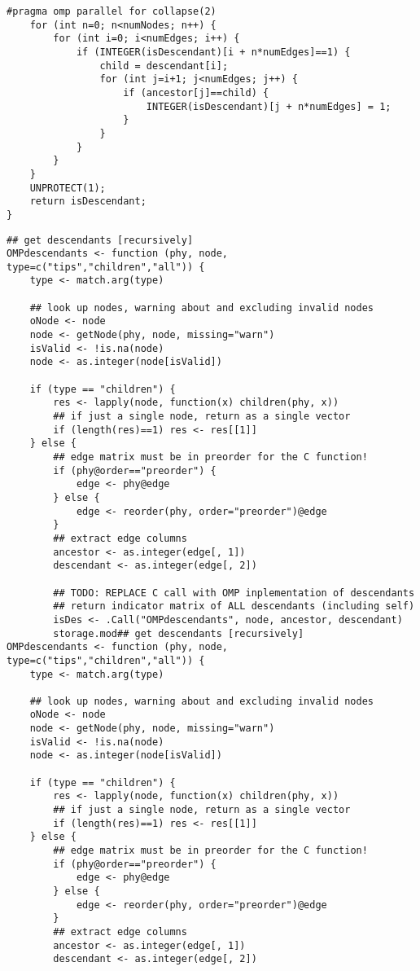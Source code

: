 \documentclass[11pt,letterpaper]{article}
\begin{document}
\begin{lstlisting}[style=MyC++Style]
#pragma omp parallel for collapse(2)
    for (int n=0; n<numNodes; n++) {
        for (int i=0; i<numEdges; i++) {
            if (INTEGER(isDescendant)[i + n*numEdges]==1) {
                child = descendant[i];
                for (int j=i+1; j<numEdges; j++) {
                    if (ancestor[j]==child) {
                        INTEGER(isDescendant)[j + n*numEdges] = 1; 
                    }
                }
            }
        }
    }
    UNPROTECT(1);
    return isDescendant;
}
\end{lstlisting}

\begin{lstlisting}[style=MyR]
## get descendants [recursively]
OMPdescendants <- function (phy, node, type=c("tips","children","all")) {
    type <- match.arg(type)

    ## look up nodes, warning about and excluding invalid nodes
    oNode <- node
    node <- getNode(phy, node, missing="warn")
    isValid <- !is.na(node)
    node <- as.integer(node[isValid])

    if (type == "children") {
        res <- lapply(node, function(x) children(phy, x))
        ## if just a single node, return as a single vector
        if (length(res)==1) res <- res[[1]]
    } else {
        ## edge matrix must be in preorder for the C function!
        if (phy@order=="preorder") {
            edge <- phy@edge
        } else {
            edge <- reorder(phy, order="preorder")@edge
        }
        ## extract edge columns
        ancestor <- as.integer(edge[, 1])
        descendant <- as.integer(edge[, 2])
        
        ## TODO: REPLACE C call with OMP inplementation of descendants
        ## return indicator matrix of ALL descendants (including self)
        isDes <- .Call("OMPdescendants", node, ancestor, descendant)
        storage.mod## get descendants [recursively]
OMPdescendants <- function (phy, node, type=c("tips","children","all")) {
    type <- match.arg(type)

    ## look up nodes, warning about and excluding invalid nodes
    oNode <- node
    node <- getNode(phy, node, missing="warn")
    isValid <- !is.na(node)
    node <- as.integer(node[isValid])

    if (type == "children") {
        res <- lapply(node, function(x) children(phy, x))
        ## if just a single node, return as a single vector
        if (length(res)==1) res <- res[[1]]
    } else {
        ## edge matrix must be in preorder for the C function!
        if (phy@order=="preorder") {
            edge <- phy@edge
        } else {
            edge <- reorder(phy, order="preorder")@edge
        }
        ## extract edge columns
        ancestor <- as.integer(edge[, 1])
        descendant <- as.integer(edge[, 2])
        

\end{lstlisting}
\end{document}
